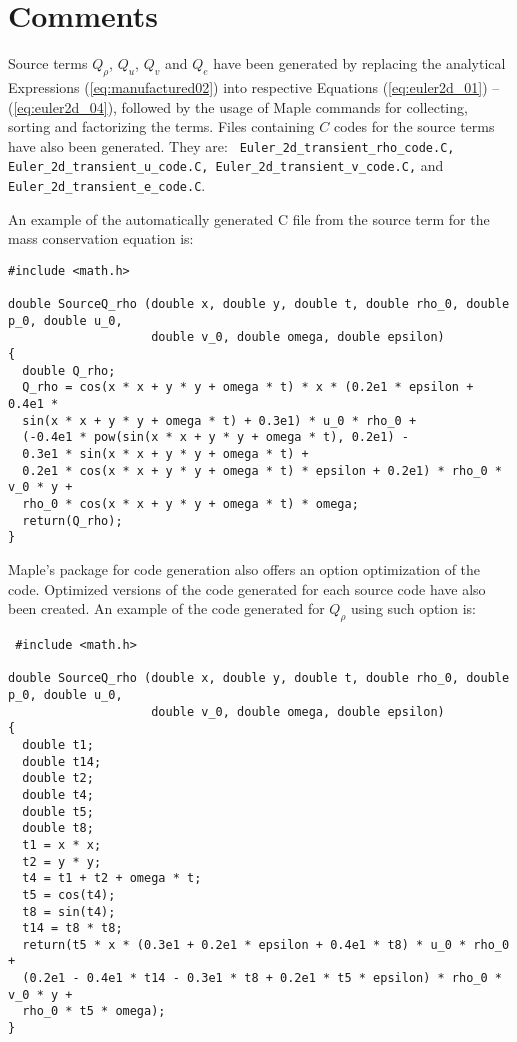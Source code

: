 \documentclass[10pt]{article}
\begin{document}
\section{Comments}

Source terms $Q_{\rho}$, $Q_u$, $Q_v$ and $Q_e$ have been generated by replacing the analytical Expressions (\ref{eq:manufactured02}) into respective Equations (\ref{eq:euler2d_01}) -- (\ref{eq:euler2d_04}), followed by the usage of Maple commands for collecting, sorting and factorizing the terms. Files containing $C$ codes for the source terms have also been generated. They are: \texttt{ Euler\_2d\_transient\_rho\_code.C, Euler\_2d\_transient\_u\_code.C, Euler\_2d\_transient\_v\_code.C,} and\\ \texttt{Euler\_2d\_transient\_e\_code.C}.

An example of the automatically generated C file from the source term for the mass conservation equation is:
\begin{verbatim}
#include <math.h>

double SourceQ_rho (double x, double y, double t, double rho_0, double p_0, double u_0,
                    double v_0, double omega, double epsilon)
{
  double Q_rho;
  Q_rho = cos(x * x + y * y + omega * t) * x * (0.2e1 * epsilon + 0.4e1 *
  sin(x * x + y * y + omega * t) + 0.3e1) * u_0 * rho_0 +
  (-0.4e1 * pow(sin(x * x + y * y + omega * t), 0.2e1) -
  0.3e1 * sin(x * x + y * y + omega * t) +
  0.2e1 * cos(x * x + y * y + omega * t) * epsilon + 0.2e1) * rho_0 * v_0 * y +
  rho_0 * cos(x * x + y * y + omega * t) * omega;
  return(Q_rho);
}
\end{verbatim}

Maple's package for code generation also offers an option optimization of the code. Optimized versions of the code generated for each source code have also been created. An example of the code generated for $Q_\rho$ using such option is:
\begin{verbatim}
 #include <math.h>

double SourceQ_rho (double x, double y, double t, double rho_0, double p_0, double u_0,
                    double v_0, double omega, double epsilon)
{
  double t1;
  double t14;
  double t2;
  double t4;
  double t5;
  double t8;
  t1 = x * x;
  t2 = y * y;
  t4 = t1 + t2 + omega * t;
  t5 = cos(t4);
  t8 = sin(t4);
  t14 = t8 * t8;
  return(t5 * x * (0.3e1 + 0.2e1 * epsilon + 0.4e1 * t8) * u_0 * rho_0 +
  (0.2e1 - 0.4e1 * t14 - 0.3e1 * t8 + 0.2e1 * t5 * epsilon) * rho_0 * v_0 * y +
  rho_0 * t5 * omega);
}
\end{verbatim}
\end{document}
